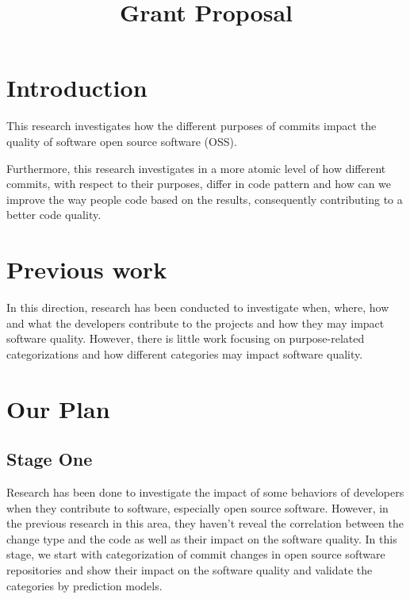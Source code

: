 \documentclass[10pt,conference]{IEEEtran}
\begin{document}
\title{Grant Proposal}

\author{
}

\maketitle


\section{Introduction}

This research investigates how the different purposes of commits impact the quality of software open source software (OSS). 


Furthermore, this research investigates in a more atomic level of how different commits, with respect to their purposes, differ in code pattern and how can we improve the way people code based on the results, consequently contributing to a better code quality.

\section{Previous work}

In this direction, research has been conducted to investigate when, where, how and what the developers contribute to the projects and how they may impact software quality. However, there is little work focusing on purpose-related categorizations and how different categories may impact software quality.

\section{Our Plan}

\subsection{Stage One}
Research has been done to investigate the impact of some behaviors of developers when they contribute to software, especially open source software. However, in the previous research in this area, they haven't reveal the correlation between the change type and the code as well as their impact on the software quality. In this stage, we start with categorization of commit changes in open source software repositories and show their impact on the software quality and validate the categories by prediction models.
\end{document}
